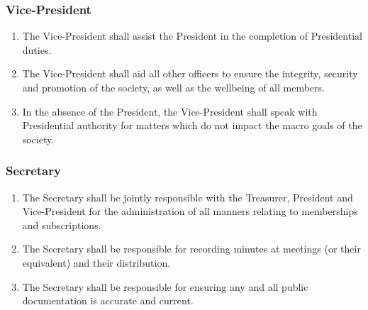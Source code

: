 \documentclass[parskip=half]{scrartcl}
\begin{document}
            \subsubsection{Vice-President}
                \label{executive--executive-positions--vice-president}
                \begin{enumerate}
                    \item The Vice-President shall assist the President in the completion of Presidential duties.
                    
                    \item The Vice-President shall aid all other officers to ensure the  integrity, security and promotion of the society, as well as the wellbeing of all members. 
                    
                    \item In the absence of the President, the Vice-President shall speak with Presidential authority for matters which do not impact the macro goals of the society.
                \end{enumerate}
            
            \subsubsection{Secretary}
                \label{executive--executive-positions--secretary}
                \begin{enumerate}
                    \item The Secretary shall be jointly responsible with the Treasurer, President and Vice-President for the administration of all manners relating to memberships and subscriptions.
                    
                    \item The Secretary shall be responsible for recording  minutes at meetings (or their equivalent) and their distribution.
                    
                    \item The Secretary shall be responsible for ensuring any and all public documentation is accurate and current.
                \end{enumerate}
            
\end{document}
